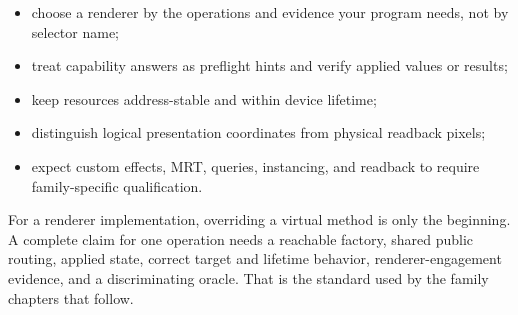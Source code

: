 \begin{itemize}
  \item choose a renderer by the operations and evidence your program needs, not by selector name;
  \item treat capability answers as preflight hints and verify applied values or results;
  \item keep resources address-stable and within device lifetime;
  \item distinguish logical presentation coordinates from physical readback pixels;
  \item expect custom effects, MRT, queries, instancing, and readback to require family-specific
        qualification.
\end{itemize}

For a renderer implementation, overriding a virtual method is only the beginning. A complete
claim for one operation needs a reachable factory, shared public routing, applied state, correct
target and lifetime behavior, renderer-engagement evidence, and a discriminating oracle. That is
the standard used by the family chapters that follow.
